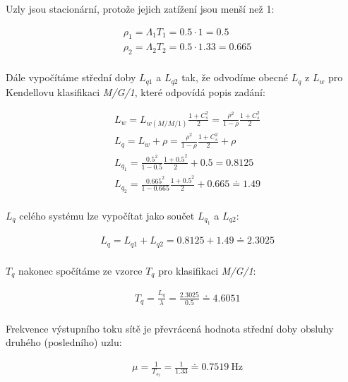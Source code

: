 \documentclass[12pt, a4paper]{article}
\begin{document}
Uzly jsou stacionární, protože jejich zatížení jsou menší než 1:

\begin{equation}
    \begin{split}
    & \rho_1 = \Lambda_1T_1 = 0.5 \cdot 1 = 0.5 \\
    & \rho_2 = \Lambda_2T_2 = 0.5 \cdot 1.33 = 0.665 \\
    \end{split}
\end{equation}

Dále vypočítáme střední doby $L_{q1}$ a $L_{q2}$ tak, že odvodíme obecné $L_q$ z $L_w$ pro Kendellovu klasifikaci \textit{M/G/1}, které odpovídá popis zadání:


\begin{equation}
    \begin{split}
    & L_w = L_{w(M/M/1)} \frac{1+C_{s}^{2}}{2} = \frac{\rho^2}{1 - \rho} \frac{1+C_{s}^{2}}{2}\\
    & L_q = L_w + \rho =  \frac{\rho^2}{1 - \rho} \frac{1+C_{s}^{2}}{2}  + \rho \\
    & L_{q_1} = \frac{0.5^2}{1 - 0.5} \frac{1+0.5^{2}}{2} + 0.5 = 0.8125 \\
    & L_{q_2} = \frac{0.665^2}{1 - 0.665} \frac{1+0.5^{2}}{2} + 0.665 \doteq 1.49 \\
    \end{split}
\end{equation}

$L_q$ celého systému lze vypočítat jako součet $L_{q_1}$ a $L_{q2}$:



\begin{equation}
    \begin{split}
    & L_q = L_{q1} + L_{q2} = 0.8125 + 1.49 \doteq 2.3025 \\
    \end{split}
\end{equation}

$T_q$ nakonec spočítáme ze vzorce $T_q$ pro klasifikaci \textit{M/G/1}:

\begin{equation}
    \begin{split}
    & T_q = \frac{L_q}{\lambda} = \frac{2.3025}{0.5} \doteq 4.6051 \\
    \end{split}
\end{equation}

Frekvence výstupního toku sítě je převrácená hodnota střední doby obsluhy druhého (posledního) uzlu:

\begin{equation}
    \begin{split}
    & \mu = \frac{1}{T_{s_2}} = \frac{1}{1.33} \doteq \SI[product-units = single]{0.7519}{\Hz} \\
    \end{split}
\end{equation}
\end{document}
